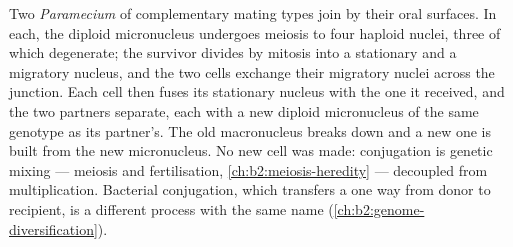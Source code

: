 \begin{proposition}\label{prop:b2:unicellular-diversity:conjugation}
Two \emph{Paramecium} of complementary mating types join by their
oral surfaces. In each, the diploid micronucleus undergoes meiosis to
four haploid nuclei, three of which degenerate; the survivor divides
by mitosis into a stationary and a migratory nucleus, and the two
cells exchange their migratory nuclei across the junction. Each cell
then fuses its stationary nucleus with the one it received, and the
two partners separate, each with a new diploid micronucleus of the
same genotype as its partner's. The old macronucleus breaks down and
a new one is built from the new micronucleus. No new cell was made:
conjugation is genetic mixing --- meiosis and fertilisation,
\cref{ch:b2:meiosis-heredity} --- decoupled from multiplication.
Bacterial conjugation, which transfers a  one way from donor
to recipient, is a different process with the same name
(\cref{ch:b2:genome-diversification}).
\end{proposition}

